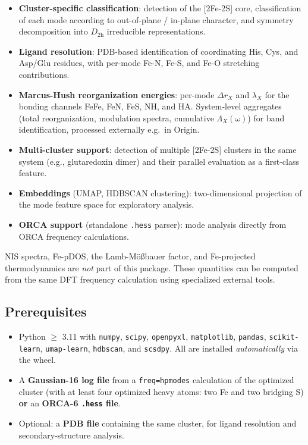 \documentclass[11pt,a4paper,twoside]{article}
\theoremstyle{remark}
\begin{document}
\begin{itemize}
  \item \textbf{Cluster-specific classification}: detection of the
        {[}2Fe-2S{]} core, classification of each mode according to
        out-of-plane / in-plane character, and symmetry decomposition
        into $D_\mathrm{2h}$ irreducible representations.
  \item \textbf{Ligand resolution}: PDB-based identification of
        coordinating His, Cys, and Asp/Glu residues, with per-mode
        Fe-N, Fe-S, and Fe-O stretching contributions.
  \item \textbf{Marcus-Hush reorganization energies}: per-mode
        $\Delta r_X$ and $\lambda_X$ for the bonding channels FeFe,
        FeN, FeS, NH, and HA. System-level aggregates (total
        reorganization, modulation spectra, cumulative
        $\Lambda_X(\omega)$) for band identification, processed
        externally e.g.\ in Origin.
  \item \textbf{Multi-cluster support}: detection of multiple
        {[}2Fe-2S{]} clusters in the same system (e.g., glutaredoxin
        dimer) and their parallel evaluation as a first-class feature.
  \item \textbf{Embeddings} (UMAP, HDBSCAN clustering):
        two-dimensional projection of the mode feature space for
        exploratory analysis.
  \item \textbf{ORCA support} (standalone \texttt{.hess} parser):
        mode analysis directly from ORCA frequency calculations.
\end{itemize}

NIS spectra, Fe-pDOS, the Lamb-M\"o\ss bauer factor, and
Fe-projected thermodynamics are \emph{not} part of this package.
These quantities can be computed from the same DFT frequency
calculation using specialized external tools.

\subsection{Prerequisites}

\begin{itemize}
  \item Python $\geq$ 3.11 with \texttt{numpy}, \texttt{scipy},
        \texttt{openpyxl}, \texttt{matplotlib}, \texttt{pandas},
        \texttt{scikit-learn}, \texttt{umap-learn}, \texttt{hdbscan},
        and \texttt{scsdpy}. All are installed
        \emph{automatically} via the wheel.
  \item A \textbf{Gaussian-16 log file} from a
        \texttt{freq=hpmodes} calculation of the optimized cluster
        (with at least four optimized heavy atoms: two Fe and two
        bridging S) \textbf{or} an \textbf{ORCA-6
        \texttt{.hess} file}.
  \item Optional: a \textbf{PDB file} containing the same cluster, for
        ligand resolution and secondary-structure analysis.
\end{itemize}
\end{document}
